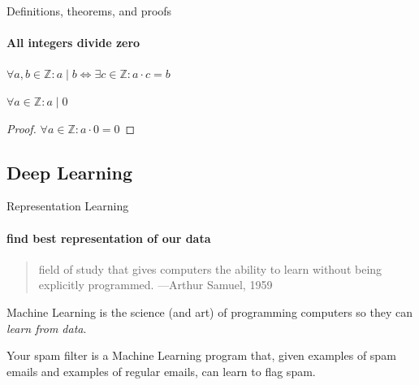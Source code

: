 \documentclass{beamer}
\begin{document}
    \begin{frame}[label=proof]{Definitions, theorems, and proofs}
      \framesubtitle{All integers divide zero}
      \begin{definition}
        $\forall a,b\in\mathds{Z}: a\mid b\iff\exists c\in\mathds{Z}:a\cdot c=b$
      \end{definition}
      \begin{theorem}
        $\forall a\in\mathds{Z}: a\mid 0$
      \end{theorem}
      \begin{proof}[Proof\nopunct]
        $\forall a\in\mathds{Z}: a\cdot 0=0$
      \end{proof}
    \end{frame}

    \subsection{Deep Learning}
    
    \begin{frame}[t]{Representation Learning}
      \framesubtitle{find best representation of our data}%
      \begin{quote}
        field of study that gives computers the ability to learn without being explicitly programmed.
        \hfill {\tiny —Arthur Samuel, 1959}
      \end{quote}
      Machine Learning is the science (and art) of programming computers so they can \textit{learn from data}. \\
      \vspace{8mm}
      \parbox{0.55\textwidth}{
      Your spam filter is a Machine Learning program that, given examples of spam emails and examples of regular emails, can learn to flag spam.
      }
    \end{frame}
\end{document}
